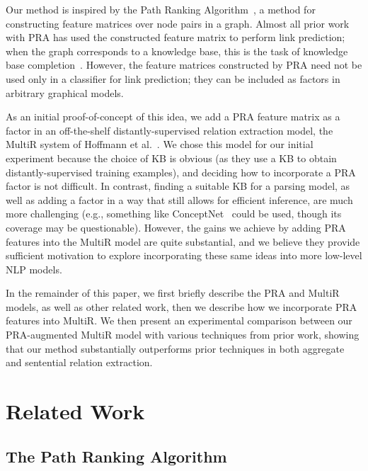 \documentclass[11pt,a4paper]{article}
\begin{document}
Our method is inspired by the Path Ranking Algorithm~\cite[PRA]{lao-2010-pra},
a method for constructing feature matrices over node pairs in a graph.  Almost
all prior work with PRA has used the constructed feature matrix to perform link
prediction; when the graph corresponds to a knowledge base, this is the task of
knowledge base completion~\cite{lao-2011-pra2,lao-2012-syntactic-pra,%
dong-2014-knowledge-vault,gardner-2013-latent-pra,gardner-2014-vector-space-pra}.
However, the feature matrices constructed by PRA need not be used only in a
classifier for link prediction; they can be included as factors in arbitrary
graphical models.

As an initial proof-of-concept of this idea, we add a PRA feature matrix as a
factor in an off-the-shelf distantly-supervised relation extraction model, the
MultiR system of Hoffmann et al.~.
We chose this model for our initial experiment because the choice of KB is
obvious (as they use a KB to obtain distantly-supervised training examples),
and deciding how to incorporate a PRA factor is not difficult.  In contrast,
finding a suitable KB for a parsing model, as well as adding a factor in a way
that still allows for efficient inference, are much more challenging (e.g.,
something like ConceptNet~\cite{conceptnet-2004} could be used, though its
coverage may be questionable).  However, the gains we achieve by adding PRA
features into the MultiR model are quite substantial, and we believe they
provide sufficient motivation to explore incorporating these same ideas into
more low-level NLP models.

In the remainder of this paper, we first briefly describe the PRA and MultiR
models, as well as other related work, then we describe how we incorporate PRA
features into MultiR.  We then present an experimental comparison between our
PRA-augmented MultiR model with various techniques from prior work, showing
that our method substantially outperforms prior techniques in both aggregate
and sentential relation extraction.

\section{Related Work}

\subsection{The Path Ranking Algorithm}
\end{document}
